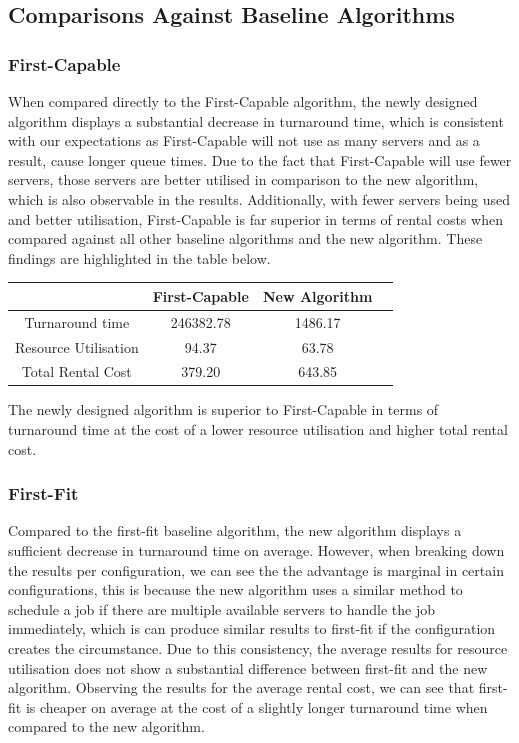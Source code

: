 \documentclass[a4paper]{article}
\begin{document}
\subsection*{Comparisons Against Baseline Algorithms}
\subsubsection*{First-Capable}
When compared directly to the First-Capable algorithm, the newly designed algorithm displays a substantial decrease in turnaround time, which is consistent with our expectations as First-Capable will not use as many servers and as a result, cause longer queue times. Due to the fact that First-Capable will use fewer servers, those servers are better utilised in comparison to the new algorithm, which is also observable in the results. Additionally, with fewer servers being used and better utilisation, First-Capable is far superior in terms of rental costs when compared against all other baseline algorithms and the new algorithm. These findings are highlighted in the table below.

\begin{center}
\begin{tabular}{|c|c|c|c|} 
 \hline
   & First-Capable & New Algorithm \\ [0.5ex] 
 \hline
 Turnaround time & 246382.78 & 1486.17 \\ 
 \hline
 Resource Utilisation & 94.37 & 63.78 \\
 \hline
 Total Rental Cost & 379.20 & 643.85 \\
 \hline
\end{tabular}
\end{center}

The newly designed algorithm is superior to First-Capable in terms of turnaround time at the cost of a lower resource utilisation and higher total rental cost.

\subsubsection*{First-Fit}
Compared to the first-fit baseline algorithm, the new algorithm displays a sufficient decrease in turnaround time on average. However, when breaking down the results per configuration, we can see the the advantage is marginal in certain configurations, this is because the new algorithm uses a similar method to schedule a job if there are multiple available servers to handle the job immediately, which is can produce similar results to first-fit if the configuration creates the circumstance. Due to this consistency, the average results for resource utilisation does not show a substantial difference between first-fit and the new algorithm. Observing the results for the average rental cost, we can see that first-fit is cheaper on average at the cost of a slightly longer turnaround time when compared to the new algorithm.
\end{document}
